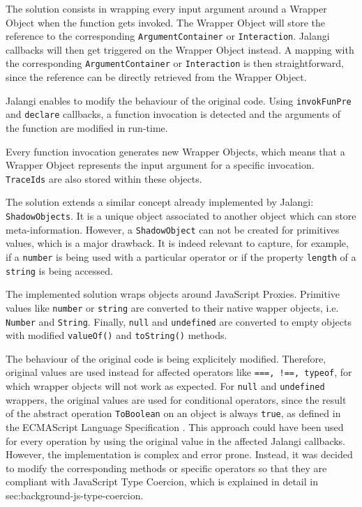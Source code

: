 The solution consists in wrapping every input argument around a Wrapper Object when the function gets invoked. The Wrapper Object will store the reference to the corresponding \texttt{ArgumentContainer} or \texttt{Interaction}. Jalangi callbacks will then get triggered on the Wrapper Object instead. A mapping with the corresponding \texttt{ArgumentContainer} or \texttt{Interaction} is then straightforward, since the reference can be directly retrieved from the Wrapper Object.

Jalangi enables to modify the behaviour of the original code. Using \texttt{invokFunPre} and \texttt{declare} callbacks, a function invocation is detected and the arguments of the function are modified in run-time.

Every function invocation generates new Wrapper Objects, which means that a Wrapper Object represents the input argument for a specific invocation. \texttt{TraceIds} are also stored within these objects.

The solution extends a similar concept already implemented by Jalangi: \texttt{ShadowObjects}. It is a unique object associated to another object which can store meta-information. However, a \texttt{ShadowObject} can not be created for primitives values, which is a major drawback. It is indeed relevant to capture, for example, if a \texttt{number} is being used with a particular operator or if the property \texttt{length} of a \texttt{string} is being accessed.

The implemented solution wraps objects around JavaScript Proxies. Primitive values like \texttt{number} or \texttt{string} are converted to their native wapper objects, i.e. \texttt{Number} and \texttt{String}. Finally, \texttt{null} and \texttt{undefined} are converted to empty objects with modified \texttt{valueOf()} and \texttt{toString()} methods.

The behaviour of the original code is being explicitely modified. Therefore, original values are used instead for affected operators like \texttt{===, !==, typeof}, for which wrapper objects will not work as expected. For \texttt{null} and \texttt{undefined} wrappers, the original values are used for conditional operators, since the result of the abstract operation \texttt{ToBoolean} on an object is always \texttt{true}, as defined in the ECMAScript Language Specification \citep{ecma-script}. This approach could have been used for every operation by using the original value in the affected Jalangi callbacks. However, the implementation is complex and error prone. Instead, it was decided to modify the corresponding methods or specific operators so that they are compliant with JavaScript Type Coercion, which is explained in detail in {sec:background-js-type-coercion}.

